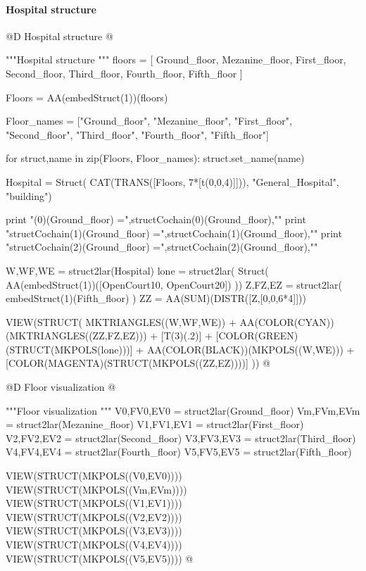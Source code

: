 \documentclass[11pt,oneside]{article}    %
\begin{document}
\paragraph{Hospital structure}
@D Hospital structure
@{"""Hospital structure """
floors = [ Ground_floor, Mezanine_floor, First_floor, 
    Second_floor, Third_floor, Fourth_floor, Fifth_floor ]

Floors = AA(embedStruct(1))(floors)

Floor_names = ["Ground_floor", "Mezanine_floor", "First_floor", 
					"Second_floor", "Third_floor", "Fourth_floor", "Fifth_floor"] 
										
for struct,name in zip(Floors, Floor_names): struct.set_name(name)

Hospital = Struct( CAT(TRANS([Floors, 7*[t(0,0,4)]])), "General_Hospital", "building")

print "\nstructCochain(0)(Ground_floor) =",structCochain(0)(Ground_floor),"\n"
print "structCochain(1)(Ground_floor) =",structCochain(1)(Ground_floor),"\n"
print "structCochain(2)(Ground_floor) =",structCochain(2)(Ground_floor),"\n"

W,WF,WE = struct2lar(Hospital)
lone = struct2lar( Struct( AA(embedStruct(1))([OpenCourt10, OpenCourt20]) ))
Z,FZ,EZ = struct2lar( embedStruct(1)(Fifth_floor) )
ZZ = AA(SUM)(DISTR([Z,[0,0,6*4]]))

VIEW(STRUCT( MKTRIANGLES((W,WF,WE)) + AA(COLOR(CYAN))(MKTRIANGLES((ZZ,FZ,EZ))) + [T(3)(.2)] + [COLOR(GREEN)(STRUCT(MKPOLS(lone)))] + AA(COLOR(BLACK))(MKPOLS((W,WE))) + [COLOR(MAGENTA)(STRUCT(MKPOLS((ZZ,EZ))))] ))
@}


@D Floor visualization
@{"""Floor visualization """
V0,FV0,EV0 = struct2lar(Ground_floor)
Vm,FVm,EVm = struct2lar(Mezanine_floor)
V1,FV1,EV1 = struct2lar(First_floor)
V2,FV2,EV2 = struct2lar(Second_floor)
V3,FV3,EV3 = struct2lar(Third_floor)
V4,FV4,EV4 = struct2lar(Fourth_floor)
V5,FV5,EV5 = struct2lar(Fifth_floor)

VIEW(STRUCT(MKPOLS((V0,EV0))))
VIEW(STRUCT(MKPOLS((Vm,EVm))))
VIEW(STRUCT(MKPOLS((V1,EV1))))
VIEW(STRUCT(MKPOLS((V2,EV2))))
VIEW(STRUCT(MKPOLS((V3,EV3))))
VIEW(STRUCT(MKPOLS((V4,EV4))))
VIEW(STRUCT(MKPOLS((V5,EV5))))
@}
\end{document}
